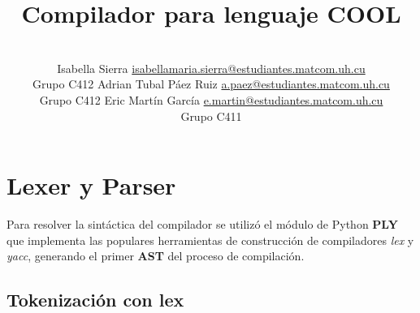 \documentclass[a4paper,10pt,twocolumn]{article}
\title{Compilador para lenguaje COOL}
\author{\\
\name Isabella Sierra \email \href{mailto:isabellamaria.sierra@estudiantes.matcom.uh.cu}{isabellamaria.sierra@estudiantes.matcom.uh.cu}
	\\ \addr Grupo C412 \AND
\name Adrian Tubal Páez Ruiz \email \href{mailto:a.paez@estudiantes.matcom.uh.cu}{a.paez@estudiantes.matcom.uh.cu}
	\\ \addr Grupo C412  \AND
\name Eric Martín García \email \href{mailto:e.martin@estudiantes.matcom.uh.cu}{e.martin@estudiantes.matcom.uh.cu}
	\\ \addr Grupo C411 
 }
\begin{document}






\section{Lexer y Parser}

Para resolver la sintáctica del compilador se utilizó el módulo de Python \textbf{PLY} que implementa las populares herramientas de construcción de compiladores \textit{lex} y \textit{yacc}, generando el primer \textbf{AST} del proceso de compilación.

\subsection{Tokenización con lex}
\end{document}
